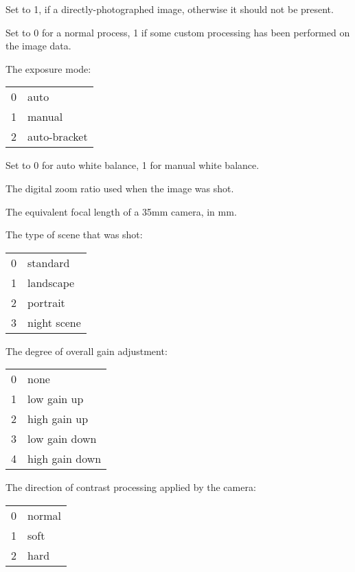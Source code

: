Set to 1, if a directly-photographed image, otherwise it should not be
present.
\apiend


Set to 0 for a normal process, 1 if some custom processing has been
performed on the image data.
\apiend

The exposure mode:
\smallskip

\begin{tabular}{p{0.3in} p{4in}}
0 & auto \\
1 & manual \\
2 & auto-bracket
\end{tabular}
\apiend

Set to 0 for auto white balance, 1 for manual white balance.
\apiend

The digital zoom ratio used when the image was shot.
\apiend

The equivalent focal length of a 35mm camera, in mm.
\apiend

The type of scene that was shot:
\smallskip

\begin{tabular}{p{0.3in} p{4in}}
0 & standard \\
1 & landscape \\
2 & portrait \\
3 & night scene
\end{tabular}
\apiend

The degree of overall gain adjustment:
\smallskip

\begin{tabular}{p{0.3in} p{4in}}
0 & none \\
1 & low gain up \\
2 & high gain up \\
3 & low gain down \\
4 & high gain down
\end{tabular}
\apiend

The direction of contrast processing applied by the camera:
\smallskip

\begin{tabular}{p{0.3in} p{4in}}
0 & normal \\
1 & soft \\
2 & hard
\end{tabular}
\apiend

